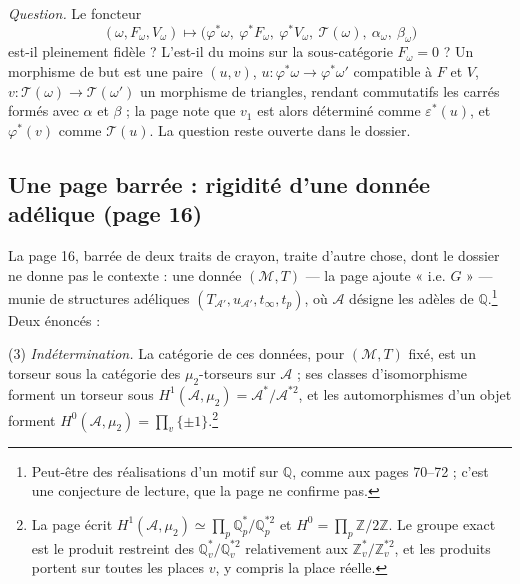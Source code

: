 \documentclass[11pt,a4paper]{article}
\begin{document}
\emph{Question.} Le foncteur
\[
(\omega, F_{\omega}, V_{\omega}) \longmapsto
\bigl(\varphi^{*}\omega,\ \varphi^{*}F_{\omega},\ \varphi^{*}V_{\omega},\
\mathcal{T}(\omega),\ \alpha_{\omega},\ \beta_{\omega}\bigr)
\]
est-il pleinement fidèle ? L'est-il du moins sur la sous-catégorie
$F_{\omega} = 0$ ? Un morphisme de but est une paire $(u, v)$, $u\colon
\varphi^{*}\omega \to \varphi^{*}\omega'$ compatible à $F$ et $V$,
$v\colon \mathcal{T}(\omega) \to \mathcal{T}(\omega')$ un morphisme de
triangles, rendant commutatifs les carrés formés avec $\alpha$ et $\beta$ ;
la page note que $v_{1}$ est alors déterminé comme $\varepsilon^{*}(u)$, et
$\varphi^{*}(v)$ comme $\mathcal{T}(u)$. La question reste ouverte dans le
dossier.

\subsection*{Une page barrée : rigidité d'une donnée adélique (page 16)}

La page 16, barrée de deux traits de crayon, traite d'autre chose, dont le
dossier ne donne pas le contexte : une donnée $(\mathcal{M}, T)$ — la page
ajoute « i.e. $G$ » — munie de structures adéliques
$(T_{\mathcal{A}'}, u_{\mathcal{A}'}, t_{\infty}, t_{p})$, où $\mathcal{A}$
désigne les adèles de $\mathbb{Q}$.\footnote{Peut-être des réalisations d'un
motif sur $\mathbb{Q}$, comme aux pages 70--72 ; c'est une conjecture de
lecture, que la page ne confirme pas.} Deux énoncés :

(3) \emph{Indétermination.} La catégorie de ces données, pour
$(\mathcal{M}, T)$ fixé, est un torseur sous la catégorie des
$\mu_{2}$-torseurs sur $\mathcal{A}$ ; ses classes d'isomorphisme forment un
torseur sous $H^{1}(\mathcal{A}, \mu_{2}) = \mathcal{A}^{*}/\mathcal{A}^{*2}$,
et les automorphismes d'un objet forment $H^{0}(\mathcal{A}, \mu_{2}) =
\prod_{v} \{\pm 1\}$.\footnote{La page écrit $H^{1}(\mathcal{A}, \mu_{2})
\simeq \prod_{p} \mathbb{Q}_{p}^{*}/\mathbb{Q}_{p}^{*2}$ et
$H^{0} = \prod_{p} \mathbb{Z}/2\mathbb{Z}$. Le groupe exact est le produit
restreint des $\mathbb{Q}_{v}^{*}/\mathbb{Q}_{v}^{*2}$ relativement aux
$\mathbb{Z}_{v}^{*}/\mathbb{Z}_{v}^{*2}$, et les produits portent sur toutes
les places $v$, y compris la place réelle.}
\end{document}

